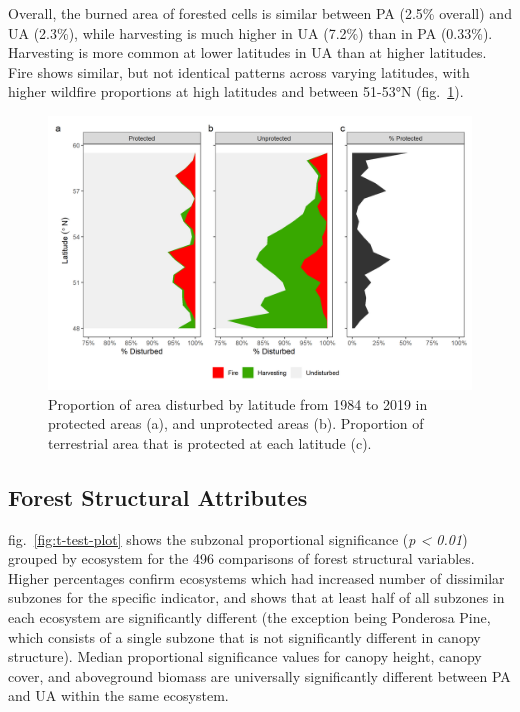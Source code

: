 \documentclass[11pt]{article}
\makeatletter
\def\maxwidth{\ifdim\Gin@nat@width>\linewidth\linewidth
\else\Gin@nat@width\fi}
\let\Oldincludegraphics\includegraphics
\renewcommand{\includegraphics}[1]{\Oldincludegraphics[width=\maxwidth]{#1}}
\makeatother
\begin{document}
Overall, the burned area of forested cells is similar between PA (2.5\%
overall) and UA (2.3\%), while harvesting is much higher in UA (7.2\%)
than in PA (0.33\%). Harvesting is more common at lower latitudes in UA
than at higher latitudes. Fire shows similar, but not identical patterns
across varying latitudes, with higher wildfire proportions at high
latitudes and between 51-53°N (fig.~\ref{fig:lat-dist}).

\begin{figure}
\hypertarget{fig:lat-dist}{%
\centering
\includegraphics{figures/latitude_disturbance_plot.png}
\caption{Proportion of area disturbed by latitude from 1984 to 2019 in
protected areas (a), and unprotected areas (b). Proportion of
terrestrial area that is protected at each latitude
(c).}\label{fig:lat-dist}
}
\end{figure}

\hypertarget{forest-structural-attributes-1}{%
\subsection{Forest Structural
Attributes}\label{forest-structural-attributes-1}}

fig.~\ref{fig:t-test-plot} shows the subzonal proportional significance
(\emph{p \textless{} 0.01}) grouped by ecosystem for the 496 comparisons
of forest structural variables. Higher percentages confirm ecosystems
which had increased number of dissimilar subzones for the specific
indicator, and shows that at least half of all subzones in each
ecosystem are significantly different (the exception being Ponderosa
Pine, which consists of a single subzone that is not significantly
different in canopy structure). Median proportional significance values
for canopy height, canopy cover, and aboveground biomass are universally
significantly different between PA and UA within the same ecosystem.
\end{document}
